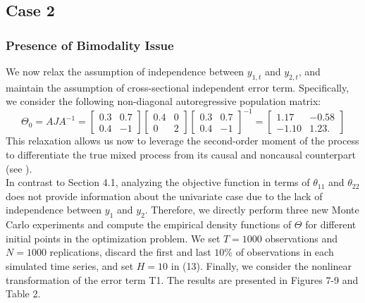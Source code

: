 \documentclass[<1p>]{elsarticle} %
\begin{document}
\subsection{\textbf{Case 2}}
\subsubsection{\textbf{Presence of Bimodality Issue}}
We now relax the assumption of independence between $y_{1,t}$ and $y_{2,t}$, and maintain the assumption of cross-sectional independent error term. Specifically, we consider the following non-diagonal autoregressive population matrix:
\begin{equation}
  \Theta_{0}=A J A^{-1}=\begin{bmatrix}
        0.3 & 0.7 \\
        0.4 & -1
    \end{bmatrix} \begin{bmatrix}
                        0.4 & 0\\
                        0 & 2
                    \end{bmatrix} \begin{bmatrix}
        0.3 & 0.7 \\
        0.4 & -1
    \end{bmatrix}^{-1} = \begin{bmatrix}
        1.17 & -0.58\\
        -1.10 & 1.23.
    \end{bmatrix}  
\end{equation}
This relaxation allows us now to leverage the second-order moment of the process to differentiate the true mixed process from its causal and noncausal counterpart (see \cite{gourieroux2017noncausal}).\\
\indent In contrast to Section 4.1, analyzing the objective function in terms of $\theta_{11}$ and $\theta_{22}$ does not provide information about the univariate case due to the lack of independence between $y_1$ and $y_2$. Therefore, we directly perform three new Monte Carlo experiments and compute the empirical density functions of $\Theta$ for different initial points in the optimization problem. We set $T=1000$ observations and $N=1000$ replications, discard the first and last $10\%$ of observations in each simulated time series, and set $H=10$ in (13). Finally, we consider the nonlinear transformation of the error term T1. The results are presented in Figures 7-9 and Table 2.\\
\end{document}

